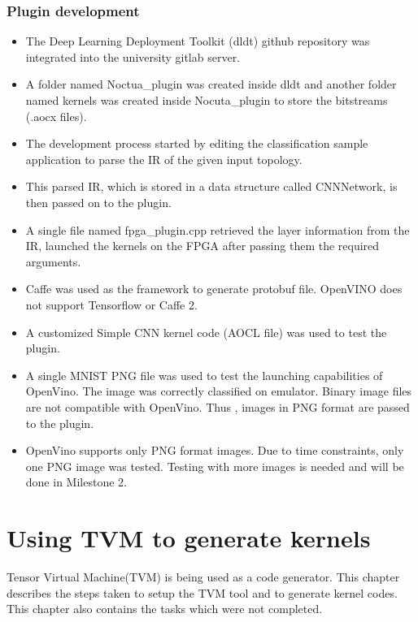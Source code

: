 \documentclass[titlepage]{report}
\begin{document}
\subsection{Plugin development}
\begin{itemize}
\item The Deep Learning Deployment Toolkit (dldt) github repository was integrated into the university gitlab server. 
\item A folder named Noctua\_plugin was created inside dldt and another folder named kernels was created inside Nocuta\_plugin to store the bitstreams (.aocx files).
\item The development process started by editing the classification sample application to parse the IR of the given input topology. 
\item This parsed IR, which is stored in a data structure called CNNNetwork, is then passed on to the plugin. 
\item A single file named fpga\_plugin.cpp retrieved the layer information from the IR, launched the kernels on the FPGA after passing them the required arguments.
\item Caffe was used as the framework to generate protobuf file. OpenVINO does not support Tensorflow or Caffe 2.
\item A customized Simple CNN kernel code (AOCL file) was used to test the plugin.
\item A single MNIST PNG file was used to test the launching capabilities of OpenVino. The image was correctly classified on emulator. Binary image files are not compatible with OpenVino. Thus , images in PNG format are passed to the plugin.
\item OpenVino supports only PNG format images. Due to time constraints, only one PNG image was tested. Testing with more images is needed and will be done in Milestone 2.
 
\end{itemize} 





\chapter{Using TVM to generate kernels}
Tensor Virtual Machine(TVM) is being used as a code generator. This chapter describes the steps taken to setup the TVM tool and to generate kernel codes. This chapter also contains the tasks which were not completed.
\end{document}
